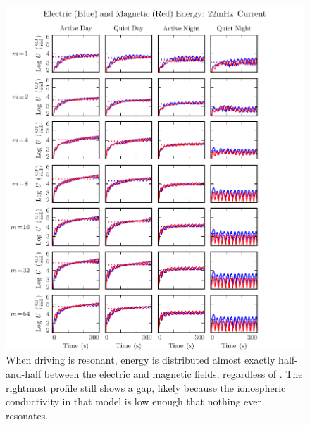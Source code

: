 \begin{figure}[H]
    \centering
    \includegraphics[width=\textwidth]{figures/U_BE_022mHz.pdf}
    \caption[Current-Driven Electric and Magnetic Energy: 22mHz]{
      When driving is resonant, energy is distributed almost exactly half-and-half between the electric and magnetic fields, regardless of \azm. The rightmost profile still shows a gap, likely because the ionospheric conductivity in that model is low enough that nothing ever resonates. 
    }
    \label{fig_U_BE_022mHz}
\end{figure}












